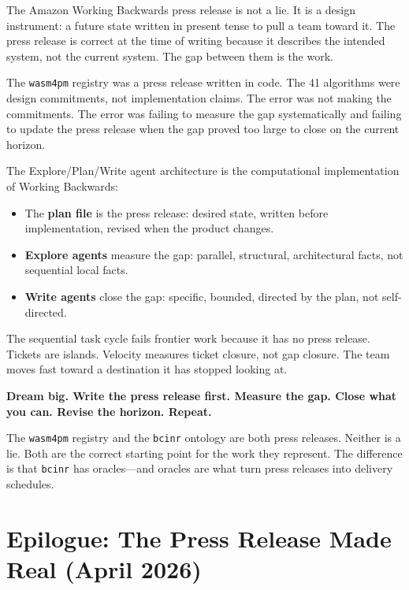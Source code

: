 \documentclass[11pt,a4paper]{article}
\newcommand{\code}[1]{\texttt{#1}}
\begin{document}
The Amazon Working Backwards press release is not a lie.  It is a design
instrument: a future state written in present tense to pull a team toward it.
The press release is correct at the time of writing because it describes the
intended system, not the current system.  The gap between them is the work.

The \code{wasm4pm} registry was a press release written in code.  The 41
algorithms were design commitments, not implementation claims.  The error was
not making the commitments.  The error was failing to measure the gap
systematically and failing to update the press release when the gap proved too
large to close on the current horizon.

The Explore/Plan/Write agent architecture is the computational implementation
of Working Backwards:

\begin{itemize}
  \item The \textbf{plan file} is the press release: desired state, written
    before implementation, revised when the product changes.
  \item \textbf{Explore agents} measure the gap: parallel, structural,
    architectural facts, not sequential local facts.
  \item \textbf{Write agents} close the gap: specific, bounded, directed by
    the plan, not self-directed.
\end{itemize}

The sequential task cycle fails frontier work because it has no press release.
Tickets are islands.  Velocity measures ticket closure, not gap closure.  The
team moves fast toward a destination it has stopped looking at.

\medskip

\textbf{Dream big.  Write the press release first.  Measure the gap.  Close
what you can.  Revise the horizon.  Repeat.}

\medskip

The \code{wasm4pm} registry and the \code{bcinr} ontology are both press
releases.  Neither is a lie.  Both are the correct starting point for the work
they represent.  The difference is that \code{bcinr} has oracles---and oracles
are what turn press releases into delivery schedules.

\section{Epilogue: The Press Release Made Real (April 2026)}
\end{document}
